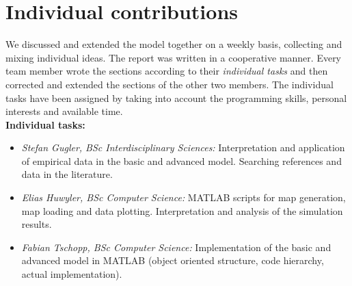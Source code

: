 \section{Individual contributions}
	We discussed and extended the model together on a weekly basis, collecting and mixing individual ideas. The report was written in a cooperative manner. Every team member wrote the sections according to their \textit{individual tasks} and then corrected and extended the sections of the other two members. The individual tasks have been assigned by taking into account the programming skills, personal interests and available time.\\
	
	\textbf{Individual tasks:}
	\begin{itemize}
		\item \textit{Stefan Gugler, BSc Interdisciplinary Sciences:} Interpretation and application of empirical data in the basic and advanced model. Searching references and data in the literature.
		\item \textit{Elias Huwyler, BSc Computer Science:} MATLAB scripts for map generation, map loading and data plotting. Interpretation and analysis of the simulation results.
		\item \textit{Fabian Tschopp, BSc Computer Science:} Implementation of the basic and advanced model in MATLAB (object oriented structure, code hierarchy, actual implementation).
	\end{itemize}
